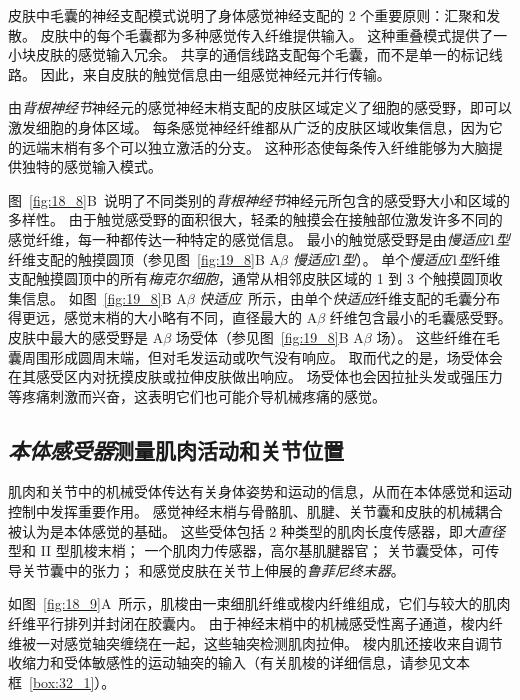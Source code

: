 皮肤中毛囊的神经支配模式说明了身体感觉神经支配的 2 个重要原则：汇聚和发散。
皮肤中的每个毛囊都为多种感觉传入纤维提供输入。
这种重叠模式提供了一小块皮肤的感觉输入冗余。
共享的通信线路支配每个毛囊，而不是单一的标记线路。 
因此，来自皮肤的触觉信息由一组感觉神经元并行传输。


由\textit{背根神经节}神经元的感觉神经末梢支配的皮肤区域定义了细胞的感受野，即可以激发细胞的身体区域。
每条感觉神经纤维都从广泛的皮肤区域收集信息，因为它的远端末梢有多个可以独立激活的分支。
这种形态使每条传入纤维能够为大脑提供独特的感觉输入模式。


图~\ref{fig:18_8}B~说明了不同类别的\textit{背根神经节}神经元所包含的感受野大小和区域的多样性。
由于触觉感受野的面积很大，轻柔的触摸会在接触部位激发许多不同的感觉纤维，每一种都传达一种特定的感觉信息。
最小的触觉感受野是由\textit{慢适应}1\textit{型}纤维支配的触摸圆顶（参见图~\ref{fig:19_8}B A$\beta$ \textit{慢适应}1\textit{型}）。
单个\textit{慢适应}1\textit{型}纤维支配触摸圆顶中的所有\textit{梅克尔细胞}，通常从相邻皮肤区域的 1 到 3 个触摸圆顶收集信息。
如图~\ref{fig:19_8}B A$\beta$ \textit{快适应}~所示，由单个\textit{快适应}纤维支配的毛囊分布得更远，感觉末梢的大小略有不同，直径最大的 A$\beta$ 纤维包含最小的毛囊感受野。
皮肤中最大的感受野是 A$\beta$ 场受体（参见图~\ref{fig:19_8}B A$\beta$ 场）。
这些纤维在毛囊周围形成圆周末端，但对毛发运动或吹气没有响应。
取而代之的是，场受体会在其感受区内对抚摸皮肤或拉伸皮肤做出响应。
场受体也会因拉扯头发或强压力等疼痛刺激而兴奋，这表明它们也可能介导机械疼痛的感觉。



\subsection{\textit{本体感受器}测量肌肉活动和关节位置}

肌肉和关节中的机械受体传达有关身体姿势和运动的信息，从而在本体感觉和运动控制中发挥重要作用。
感觉神经末梢与骨骼肌、肌腱、关节囊和皮肤的机械耦合被认为是本体感觉的基础。
这些受体包括 2 种类型的肌肉长度传感器，即\textit{大直径}型和 II 型肌梭末梢；
一个肌肉力传感器，高尔基肌腱器官；
关节囊受体，可传导关节囊中的张力；
和感觉皮肤在关节上伸展的\textit{鲁菲尼终末器}。


如图~\ref{fig:18_9}A~所示，肌梭由一束细肌纤维或梭内纤维组成，它们与较大的肌肉纤维平行排列并封闭在胶囊内。
由于神经末梢中的机械感受性离子通道，梭内纤维被一对感觉轴突缠绕在一起，这些轴突检测肌肉拉伸。
梭内肌还接收来自调节收缩力和受体敏感性的运动轴突的输入（有关肌梭的详细信息，请参见文本框~\ref{box:32_1}）。


